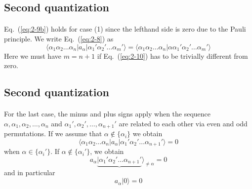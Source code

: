\documentclass[%
twoside,                 %
final,                   %
10pt]{article}
\begin{document}
\subsection{Second quantization}

\paragraph{}
Eq.~(\ref{eq:2-9b}) holds for case (1) since the lefthand side is zero due to the Pauli principle. We write
Eq.~(\ref{eq:2-8}) as
\begin{equation}
	\langle\alpha_1\alpha_2 \dots \alpha_n|a_\alpha|\alpha_1'\alpha_2' \dots \alpha_m'\rangle = 
	\langle \alpha_1\alpha_2 \dots \alpha_n|\alpha\alpha_1'\alpha_2' \dots \alpha_m'\rangle \label{eq:2-10}
\end{equation}
Here we must have $m = n+1$ if Eq.~(\ref{eq:2-10}) has to be trivially different from zero.




\subsection{Second quantization}

\paragraph{}
For the last case, the minus and plus signs apply when the sequence 
$\alpha ,\alpha_1, \alpha_2, \dots, \alpha_n$ and 
$\alpha_1', \alpha_2', \dots, \alpha_{n+1}'$ are related to each other via even and odd permutations.
If we assume that  $\alpha \notin \{\alpha_i\}$ we obtain 
\begin{equation}
	\langle\alpha_1\alpha_2 \dots \alpha_n|a_\alpha|\alpha_1'\alpha_2' \dots \alpha_{n+1}'\rangle = 0 \label{eq:2-12}
\end{equation}
when $\alpha \in \{\alpha_i'\}$. If $\alpha \notin \{\alpha_i'\}$, we obtain
\begin{equation}
	a_\alpha\underbrace{|\alpha_1'\alpha_2' \dots \alpha_{n+1}'}\rangle_{\neq \alpha} = 0 \label{eq:2-13a}
\end{equation}
and in particular
\begin{equation}
	a_\alpha |0\rangle = 0 \label{eq:2-13b}
\end{equation}
\end{document}
